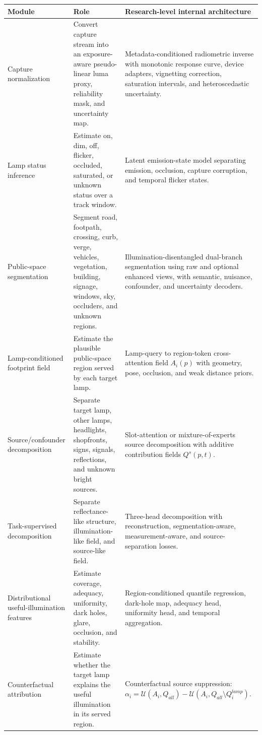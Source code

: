 \documentclass[11pt]{article}
\newcommand{\U}{\mathcal{U}}
\begin{document}
\begin{center}
\scriptsize
\begin{tabular}{p{}p{}p{}}
\toprule
\textbf{Module} & \textbf{Role} & \textbf{Research-level internal architecture} \\
\midrule
Capture normalization & Convert capture stream into an exposure-aware pseudo-linear luma proxy, reliability mask, and uncertainty map. & Metadata-conditioned radiometric inverse with monotonic response curve, device adapters, vignetting correction, saturation intervals, and heteroscedastic uncertainty. \\
Lamp status inference & Estimate on, dim, off, flicker, occluded, saturated, or unknown status over a track window. & Latent emission-state model separating emission, occlusion, capture corruption, and temporal flicker states. \\
Public-space segmentation & Segment road, footpath, crossing, curb, verge, vehicles, vegetation, building, signage, windows, sky, occluders, and unknown regions. & Illumination-disentangled dual-branch segmentation using raw and optional enhanced views, with semantic, nuisance, confounder, and uncertainty decoders. \\
Lamp-conditioned footprint field & Estimate the plausible public-space region served by each target lamp. & Lamp-query to region-token cross-attention field \(A_i(p)\) with geometry, pose, occlusion, and weak distance priors. \\
Source/confounder decomposition & Separate target lamp, other lamps, headlights, shopfronts, signs, signals, reflections, and unknown bright sources. & Slot-attention or mixture-of-experts source decomposition with additive contribution fields \(Q^s(p,t)\). \\
Task-supervised decomposition & Separate reflectance-like structure, illumination-like field, and source-like field. & Three-head decomposition with reconstruction, segmentation-aware, measurement-aware, and source-separation losses. \\
Distributional useful-illumination features & Estimate coverage, adequacy, uniformity, dark holes, glare, occlusion, and stability. & Region-conditioned quantile regression, dark-hole map, adequacy head, uniformity head, and temporal aggregation. \\
Counterfactual attribution & Estimate whether the target lamp explains the useful illumination in its served region. & Counterfactual source suppression: \(\alpha_i = \U(A_i,Q_{all}) - \U(A_i,Q_{all}\setminus Q_i^{lamp})\). \\

\end{tabular}
\end{center}
\end{document}
